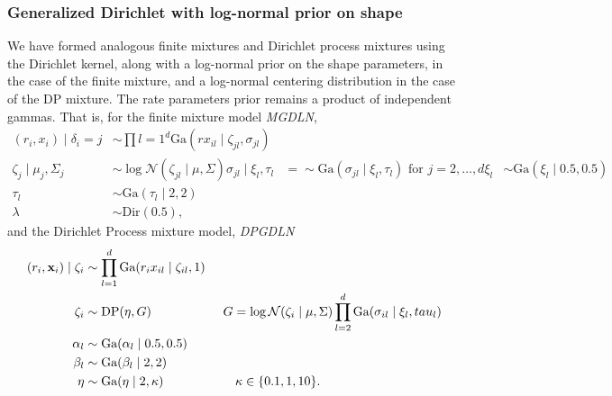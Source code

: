 \subsubsection{Generalized Dirichlet with log-normal prior on shape}
We have formed analogous finite mixtures and Dirichlet process mixtures using the Dirichlet kernel,
  along with a log-normal prior on the shape parameters, in the case of the finite mixture, and a
  log-normal centering distribution in the case of the DP mixture.  The rate parameters prior remains
  a product of independent gammas.  That is, for the finite mixture model \emph{MGDLN},
  \begin{equation}
    \begin{aligned}
      (r_i, x_i) \mid \delta_i=j &\sim \prod{l = 1}^d\text{Ga}(rx_{il}\mid \zeta_{jl}, \sigma_{jl})\\
      \zeta_{j} \mid \mu_j, \Sigma_j &\sim \log\mathcal{N}(\zeta_{jl}\mid \mu,\Sigma)
      \sigma_{jl} \mid \xi_l, \tau_l &=\sim \text{Ga}(\sigma_{jl}\mid \xi_l, \tau_l)
                                                                \text{ for }j = 2,\ldots,d
      \xi_l &\sim \text{Ga}(\xi_l\mid 0.5, 0.5)\\
      \tau_l &\sim \text{Ga}(\tau_l\mid 2, 2)\\
      \lambda &\sim \text{Dir}(0.5),
    \end{aligned}
  \end{equation}
  and the Dirichlet Process mixture model, \emph{DPGDLN}
  \begin{equation}
    \begin{aligned}
      (r_i, {\bf x}_i) \mid \zeta_i &\sim \prod_{l = 1}^d\text{Ga}(r_ix_{il}\mid \zeta_{il}, 1)\\
        \zeta_i &\sim \text{DP}(\eta, G)\hspace{2cm}G = \log\mathcal{N}(\zeta_i\mid\mu,\Sigma)
                                          \prod_{l = 2}^d \text{Ga}(\sigma_{il}\mid \xi_l,tau_l)\\
        \alpha_l &\sim \text{Ga}(\alpha_l \mid 0.5, 0.5)\\
        \beta_l &\sim \text{Ga}(\beta_l \mid 2, 2)\\
        \eta &\sim \text{Ga}(\eta \mid 2, \kappa) \hspace{2cm}\kappa \in \lbrace 0.1, 1, 10\rbrace.
    \end{aligned}
  \end{equation}
  







